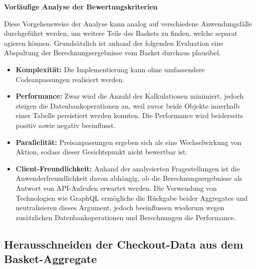 \textbf{Vorläufige Analyse der Bewertungskriterien}

Diese Vorgehensweise der Analyse kann analog auf verschiedene Anwendungsfälle durchgeführt werden, um weitere Teile des Baskets zu finden, welche separat agieren können. Grundsätzlich ist anhand der folgenden Evaluation eine Abspaltung der Berechnungsergebnisse vom Basket durchaus plausibel.

\begin{itemize}[topsep=-2pt]
	\item \textbf{Komplexität: } { Die Implementierung kann ohne umfassendere Codeanpassungen realisiert werden. }
	\item \textbf{Performance: } { Zwar wird die Anzahl der Kalkulationen minimiert, jedoch steigen die Datenbankoperationen an, weil zuvor beide Objekte innerhalb einer Tabelle persistiert werden konnten. Die Performance wird beiderseits positiv sowie negativ beeinflusst. }
	\item \textbf{Parallelität: } { Preisanpassungen ergeben sich als eine Wechselwirkung von Aktion, sodass dieser Gesichtspunkt nicht bewertbar ist. }
	\item \textbf{Client-Freundlichkeit: } { Anhand der analysierten Fragestellungen ist die Anwenderfreundlichkeit davon abhängig, ob die Berechnungsergebnisse als Antwort von API-Aufrufen erwartet werden. Die Verwendung von Technologien wie GraphQL ermögliche die Rückgabe beider Aggregates und neutralisieren dieses Argument, jedoch beeinflussen wiederum wegen zusätzlichen Datenbankoperationen und Berechnungen die Performance. }
\end{itemize}



\subsection{Herausschneiden der Checkout-Data aus dem Basket-Aggregate}

